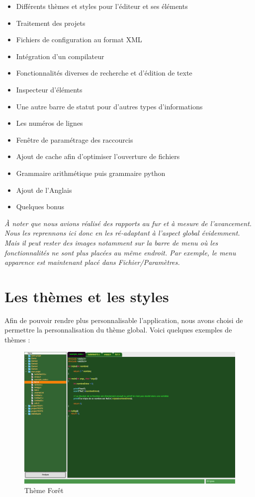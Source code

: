 \documentclass[a4paper,12pt]{article}
\begin{document}
		\begin{itemize}
			\item Différents thèmes et styles pour l'éditeur et ses éléments
			\item Traitement des projets
			\item Fichiers de configuration au format XML
			\item Intégration d'un compilateur
			\item Fonctionnalités diverses de recherche et d'édition de texte
			\item Inspecteur d'éléments
			\item Une autre barre de statut pour d'autres types d'informations
			\item Les numéros de lignes
			\item Fenêtre de paramétrage des raccourcis
			\item Ajout de cache afin d'optimiser l'ouverture de fichiers
			\item Grammaire arithmétique puis grammaire python
			\item Ajout de l'Anglais
			\item Quelques bonus \\
		\end{itemize}
		
		\textit{À noter que nous avions réalisé des rapports au fur et à mesure de l'avancement. Nous les reprennons ici donc en les ré-adaptant à l'aspect global évidemment. Mais il peut rester des images notamment sur la barre de menu où les fonctionnalités ne sont plus placées au même endroit. Par exemple, le menu apparence est maintenant placé dans Fichier/Paramètres.}
		
		
\section{Les thèmes et les styles}
	
	Afin de pouvoir rendre plus personnalisable l'application, nous avons choisi de permettre la personnalisation du thème global.
	Voici quelques exemples de thèmes : 
	
	
		\begin{figure}[h!]
			\begin{center}
				\includegraphics[scale=0.2]{images/imgs_themes/theme_forest}
				\caption{Thème Forêt}
			\end{center}
		\end{figure}
		
\end{document}
